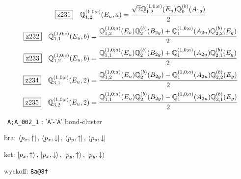 \documentclass[fleqn,10pt,landscape]{jsarticle}
\begin{document}
\begin{dmath*}
\hspace*{3mm}\fbox{z231}\quad \mathbb{Q}_{1,2}^{(1,0;c)}(E_{u},a)=\frac{\sqrt{2} \mathbb{Q}_{1,2}^{(1,0;a)}(E_{u}) \mathbb{Q}_{0}^{(b)}(A_{1g})}{2}
\end{dmath*}
\begin{dmath*}
\hspace*{3mm}\fbox{z232}\quad \mathbb{Q}_{1,1}^{(1,0;c)}(E_{u},b)=\frac{\mathbb{Q}_{1,2}^{(1,0;a)}(E_{u}) \mathbb{Q}_{2}^{(b)}(B_{2g}) + \mathbb{Q}_{1}^{(1,0;a)}(A_{2u}) \mathbb{Q}_{2,2}^{(b)}(E_{g})}{2}
\end{dmath*}
\begin{dmath*}
\hspace*{3mm}\fbox{z233}\quad \mathbb{Q}_{1,2}^{(1,0;c)}(E_{u},b)=\frac{\mathbb{Q}_{1,1}^{(1,0;a)}(E_{u}) \mathbb{Q}_{2}^{(b)}(B_{2g}) + \mathbb{Q}_{1}^{(1,0;a)}(A_{2u}) \mathbb{Q}_{2,1}^{(b)}(E_{g})}{2}
\end{dmath*}
\begin{dmath*}
\hspace*{3mm}\fbox{z234}\quad \mathbb{Q}_{3,1}^{(1,0;c)}(E_{u},2)=\frac{\mathbb{Q}_{1,2}^{(1,0;a)}(E_{u}) \mathbb{Q}_{2}^{(b)}(B_{2g}) - \mathbb{Q}_{1}^{(1,0;a)}(A_{2u}) \mathbb{Q}_{2,2}^{(b)}(E_{g})}{2}
\end{dmath*}
\begin{dmath*}
\hspace*{3mm}\fbox{z235}\quad \mathbb{Q}_{3,2}^{(1,0;c)}(E_{u},2)=\frac{\mathbb{Q}_{1,1}^{(1,0;a)}(E_{u}) \mathbb{Q}_{2}^{(b)}(B_{2g}) - \mathbb{Q}_{1}^{(1,0;a)}(A_{2u}) \mathbb{Q}_{2,1}^{(b)}(E_{g})}{2}
\end{dmath*}
\vspace{5mm}

\noindent\textbullet\, \texttt{A;A_002_1} : '\texttt{A}'-'\texttt{A}' bond-cluster

\noindent\quad * bra: $\bra{p_{x},\uparrow},\, \bra{p_{x},\downarrow},\, \bra{p_{y},\uparrow},\, \bra{p_{y},\downarrow}$

\noindent\quad * ket: $\ket{p_{x},\uparrow},\, \ket{p_{x},\downarrow},\, \ket{p_{y},\uparrow},\, \ket{p_{y},\downarrow}$

\noindent\quad * wyckoff: \texttt{8a@8f}
\end{document}
